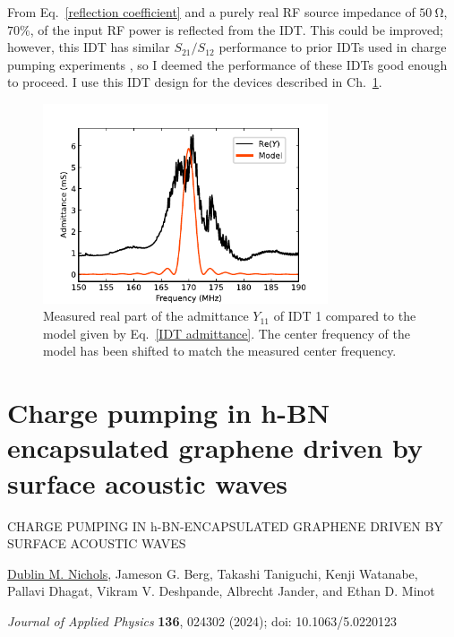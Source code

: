 \documentclass[double,12pt,1in,seploa]{beavtex}
\begin{document}
From Eq.\ \ref{reflection coefficient} and a purely real RF source impedance of $\SI{50}{\ohm}$, $70\%$, of the input RF power is reflected from the IDT. This could be improved; however, this IDT has similar $S_{21}/S_{12}$ performance to prior IDTs used in charge pumping experiments \cite{buitelaar_charge_2006}, so I deemed the performance of these IDTs good enough to proceed. I use this IDT design for the devices described in Ch.\ \ref{AE charge pumping paper}.

\begin{figure}
    \includegraphics[width = 0.75\textwidth]{Z11_plot_.pdf}
    \caption{Measured real part of the admittance $Y_{11}$ of IDT 1 compared to the model given by Eq.\ \ref{IDT admittance}. The center frequency of the model has been shifted to match the measured center frequency.}
    \label{Z11 plot}
\end{figure}

\chapter{Charge pumping in h-BN encapsulated graphene driven by surface acoustic waves}\label{AE charge pumping paper}

\clearpage

\mbox{}
\vspace{3cm}
\begin{center}
    {\large CHARGE PUMPING IN h-BN-ENCAPSULATED GRAPHENE DRIVEN BY SURFACE ACOUSTIC WAVES}
    \vspace{4cm}

    \underline{Dublin M. Nichols}, Jameson G. Berg, Takashi Taniguchi, Kenji Watanabe, Pallavi Dhagat, Vikram V. Deshpande, Albrecht Jander, and Ethan D. Minot
    \vspace{3cm}

    \textit{Journal of Applied Physics} \textbf{136}, 024302 (2024); doi: 10.1063/5.0220123
\end{center}
\end{document}

